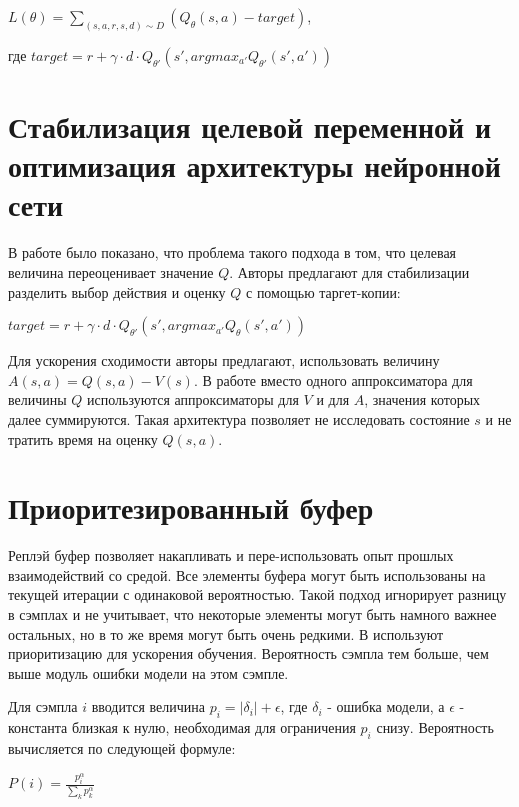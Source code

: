 \documentclass{mipt-thesis-bs}
\begin{document}
\begin{center}
    
$L(\theta)=\sum_{(s,a,r,s,d) \sim D} (Q_\theta(s, a) - target)$,

где $target = r + \gamma\cdot d \cdot Q_{\theta'}(s',argmax_{a'}Q_{\theta'}(s',a'))$ 
\end{center}

\section{Стабилизация целевой переменной и оптимизация архитектуры нейронной сети}

В работе \cite{Double DQN} было показано, что проблема такого подхода в том, что целевая величина переоценивает значение $Q$. Авторы предлагают для стабилизации разделить выбор действия и оценку $Q$ с помощью таргет-копии:

\begin{center}
$target = r + \gamma\cdot d \cdot Q_{\theta'}(s',argmax_{a'}Q_{\theta}(s',a'))$ 
\end{center}

Для ускорения сходимости авторы \cite{Dueling DQN} предлагают, использовать величину $A(s,a)=Q(s,a) - V(s)$. В работе вместо одного аппроксиматора для величины $Q$ используются аппроксиматоры для $V$ и для $A$, значения которых далее суммируются. Такая архитектура позволяет не исследовать состояние $s$ и не тратить время на оценку $Q(s,a)$.

\section{Приоритезированный буфер}

Реплэй буфер позволяет накапливать и пере-использовать опыт прошлых взаимодействий со средой. Все элементы буфера могут быть использованы на текущей итерации с одинаковой вероятностью. Такой подход игнорирует разницу в сэмплах и не учитывает, что некоторые элементы могут быть намного важнее остальных, но в то же время могут быть очень редкими. В \cite{PER} используют приоритизацию для ускорения обучения. Вероятность сэмпла тем больше, чем выше модуль ошибки модели на этом сэмпле.

Для сэмпла $i$ вводится величина $p_i=|\delta_i| + \epsilon$, где $\delta_i$ - ошибка модели, а $\epsilon$ - константа близкая к нулю, необходимая для ограничения $p_i$ снизу. Вероятность вычисляется по следующей формуле:

\begin{center}
    $P(i)=\frac{p_{i}^{\alpha}}{\sum_{k} p_{k}^{\alpha}}$
\end{center}
\end{document}

